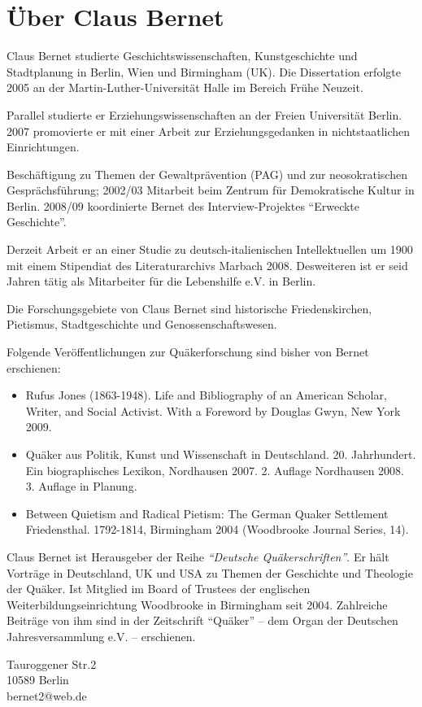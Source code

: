 \chapter{Über Claus Bernet}

Claus Bernet studierte Geschichtswissenschaften, Kunstgeschichte und
Stadtplanung in Berlin, Wien und Birmingham (UK). Die Dissertation erfolgte 2005
an der Martin-Luther-Universität Halle im Bereich Frühe Neuzeit.

\medskip

Parallel studierte er Erziehungswissenschaften an der Freien Universität Berlin.
2007 promovierte er mit einer Arbeit zur Erziehungsgedanken in nichtstaatlichen
Einrichtungen.

\medskip

Beschäftigung zu Themen der Gewaltprävention (PAG) und zur neosokratischen
Gesprächsführung; 2002/03 Mitarbeit beim Zentrum für Demokratische Kultur in
Berlin. 2008/09 koordinierte Bernet des Interview-Projektes "`Erweckte
Geschichte"'.

\medskip

Derzeit Arbeit er an einer Studie zu deutsch-italienischen Intellektuellen um
1900 mit einem Stipendiat des Literaturarchivs Marbach 2008. Desweiteren ist er
seid Jahren tätig als Mitarbeiter für die Lebenshilfe e.V. in Berlin.

\medskip

Die Forschungsgebiete von Claus Bernet sind historische Friedenskirchen,
Pietismus, Stadtgeschichte und Genossenschaftswesen.

\medskip

Folgende Veröffentlichungen zur Quäkerforschung sind bisher von Bernet
erschienen:

\begin{itemize}
 \item Rufus Jones (1863-1948). Life and Bibliography of an American Scholar,
Writer, and Social Activist. With a Foreword by Douglas Gwyn, New York 2009.
 \item Quäker aus Politik, Kunst und Wissenschaft in Deutschland. 20.
Jahrhundert. Ein biographisches Lexikon, Nordhausen 2007. 2. Auflage Nordhausen
2008. 3. Auflage in Planung.
 \item Between Quietism and Radical Pietism: The German Quaker Settlement
Friedensthal. 1792-1814, Birmingham 2004 (Woodbrooke Journal Series, 14).
\end{itemize}

\medskip


Claus Bernet ist Herausgeber der Reihe \textit{"`Deutsche Quäkerschriften"'}. Er
hält Vorträge in Deutschland, UK und USA zu Themen der Geschichte und Theologie
der Quäker. Ist Mitglied im Board of Trustees der englischen
Weiterbildungseinrichtung Woodbrooke in Birmingham seit 2004. Zahlreiche
Beiträge von ihm sind in der Zeitschrift "`Quäker"' -- dem Organ der Deutschen
Jahresversammlung e.V. -- erschienen.

\medskip

\begin{center}
\parbox{7,5cm}{
Tauroggener Str.2
\\10589 Berlin
\\bernet2@web.de
}
\end{center}